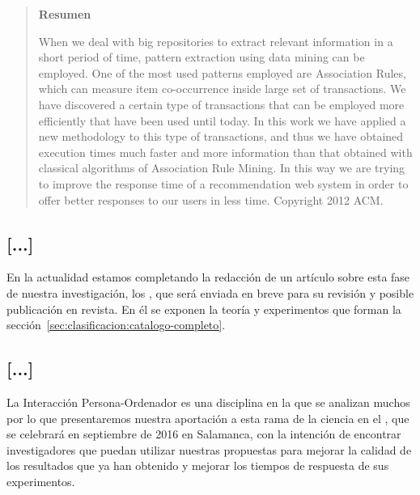 \begin{quotation}
	\noindent\textbf{Resumen}

	\nopagebreak When we deal with big repositories to extract relevant information in a short period of time, pattern extraction using data mining can be employed. One of the most used patterns employed are Association Rules, which can measure item co-occurrence inside large set of transactions. We have discovered a certain type of transactions that can be employed more efficiently that have been used until today. In this work we have applied a new methodology to this type of transactions, and thus we have obtained execution times much faster and more information than that obtained with classical algorithms of Association Rule Mining. In this way we are trying to improve the response time of a recommendation web system in order to offer better responses to our users in less time. Copyright 2012 ACM.
\end{quotation}








\subsection{[...]}
\label{sec:clasificacion:publicaciones:articulo}
En la actualidad estamos completando la redacción de un artículo sobre esta fase de nuestra investigación, los \CCs, que será enviada en breve para su revisión y posible publicación en revista. En él se exponen la teoría y experimentos que forman la sección~\ref{sec:clasificacion:catalogo-completo}.




\subsection{[...]}
\label{sec:clasificacion:publicaciones:interaccion-2016}
La Interacción Persona-Ordenador es una disciplina en la que se analizan muchos \catalogos por lo que presentaremos nuestra aportación a esta rama de la ciencia en el , que se celebrará en septiembre de 2016 en Salamanca, con la intención de encontrar investigadores que puedan utilizar nuestras propuestas para mejorar la calidad de los resultados que ya han obtenido y mejorar los tiempos de respuesta de sus experimentos.

